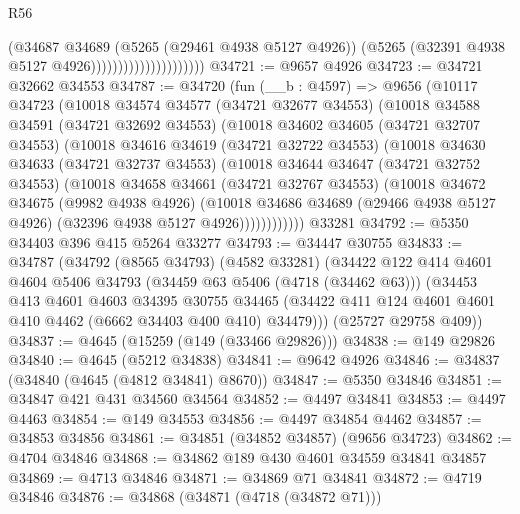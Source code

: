 \begin{lexlean}{R56}
\begin{coremodule}
                                        (@34687
                                          @34689
                                          (@5265 (@29461 @4938 @5127 @4926))
                                          (@5265 (@32391 @4938 @5127 @4926)))))))))))))))))))))
@34721 := @9657 @4926
@34723 := @34721 @32662 @34553
@34787 := @34720
    (fun (__b : @4597) =>
    @9656
      (@10117
        @34723
        (@10018
          @34574
          @34577
          (@34721 @32677 @34553)
          (@10018
            @34588
            @34591
            (@34721 @32692 @34553)
            (@10018
              @34602
              @34605
              (@34721 @32707 @34553)
              (@10018
                @34616
                @34619
                (@34721 @32722 @34553)
                (@10018
                  @34630
                  @34633
                  (@34721 @32737 @34553)
                  (@10018
                    @34644
                    @34647
                    (@34721 @32752 @34553)
                    (@10018
                      @34658
                      @34661
                      (@34721 @32767 @34553)
                      (@10018
                        @34672
                        @34675
                        (@9982 @4938 @4926)
                        (@10018
                          @34686
                          @34689
                          (@29466 @4938 @5127 @4926)
                          (@32396 @4938 @5127 @4926))))))))))))
    @33281
@34792 := @5350 @34403 @396 @415 @5264 @33277
@34793 := @34447 @30755
@34833 := @34787
    (@34792
      (@8565 @34793)
      (@4582 @33281)
      (@34422
        @122
        @414
        @4601
        @4604
        @5406
        @34793
        (@34459 @63 @5406 (@4718 (@34462 @63)))
        (@34453
          @413
          @4601
          @4603
          @34395
          @30755
          @34465
          (@34422 @411 @124 @4601 @4601 @410 @4462 (@6662 @34403 @400 @410) @34479)))
      (@25727 @29758 @409))
@34837 := @4645 (@15259 (@149 (@33466 @29826)))
@34838 := @149 @29826
@34840 := @4645 (@5212 @34838)
@34841 := @9642 @4926
@34846 := @34837 (@34840 (@4645 (@4812 @34841) @8670))
@34847 := @5350 @34846
@34851 := @34847 @421 @431 @34560 @34564
@34852 := @4497 @34841
@34853 := @4497 @4463
@34854 := @149 @34553
@34856 := @4497 @34854 @4462
@34857 := @34853 @34856
@34861 := @34851 (@34852 @34857) (@9656 @34723)
@34862 := @4704 @34846
@34868 := @34862 @189 @430 @4601 @34559 @34841 @34857
@34869 := @4713 @34846
@34871 := @34869 @71 @34841
@34872 := @4719 @34846
@34876 := @34868 (@34871 (@4718 (@34872 @71)))

\end{coremodule}
\end{lexlean}
